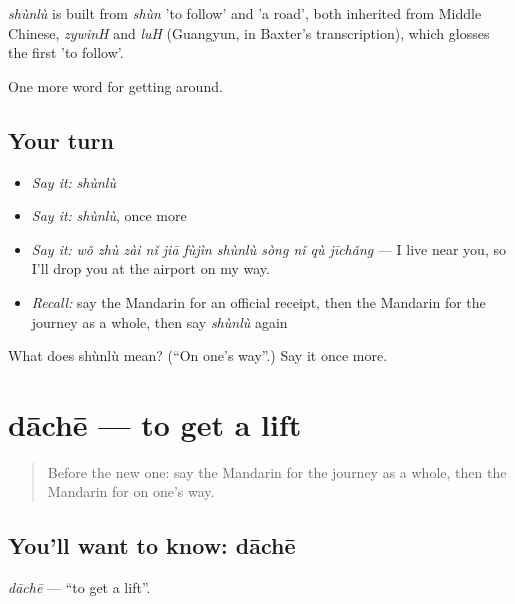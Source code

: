 \begin{cousinweb}
\emph{shùnlù} is built from \emph{shùn} 'to follow' and  'a road', both inherited from Middle Chinese, \emph{zywinH} and \emph{luH} (Guangyun, in Baxter's transcription), which glosses the first 'to follow'.
\end{cousinweb}

\begin{grammarlens}[title={What you've built}]
One more word for getting around.
\end{grammarlens}

\subsection*{Your turn}
\begin{itemize}
\raggedright
  \item \emph{Say it:} \emph{shùnlù}
  \item \emph{Say it:} \emph{shùnlù}, once more
  \item \emph{Say it:} \emph{wǒ zhù zài nǐ jiā fùjìn shùnlù sòng nǐ qù jīchǎng} — I live near you, so I'll drop you at the airport on my way.
  \item \emph{Recall:} say the Mandarin for an official receipt, then the Mandarin for the journey as a whole, then say \emph{shùnlù} again
\end{itemize}

\begin{tcolorbox}[breakable,colback=teal!4,colframe=teal!35!black,title={Before you move on}]
What does shùnlù mean? (\textquotedblleft{}On one's way\textquotedblright{}.) Say it once more.
\end{tcolorbox}
\section[dāchē]{dāchē — to get a lift}

\label{lesson:ZH-C429-dache-lift}



\begin{quote}
Before the new one: say the Mandarin for the journey as a whole, then the Mandarin for on one's way.
\end{quote}

\subsection*{You'll want to know: dāchē}
\emph{dāchē} — \textquotedblleft{}to get a lift\textquotedblright{}.

